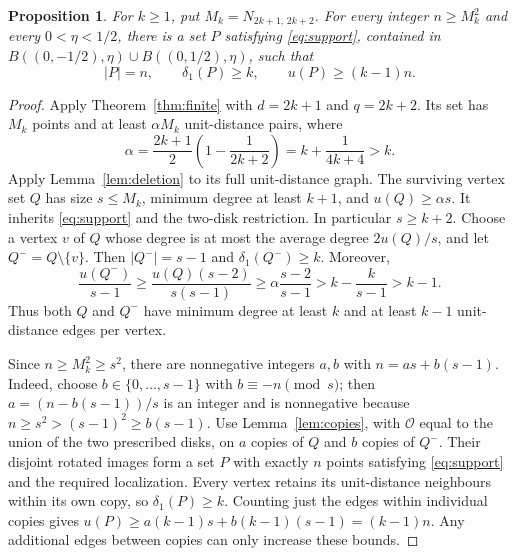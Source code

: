 \documentclass[a4paper,11pt]{amsart}
\newtheorem{proposition}[theorem]{Proposition}
\theoremstyle{remark}
\begin{document}
\begin{proposition}\label{prop:threshold}
For $k\ge1$, put $M_k=N_{2k+1,\,2k+2}$.
For every integer $n\ge M_k^2$ and every $0<\eta<1/2$, there is a set
$P$ satisfying \eqref{eq:support}, contained in
$B((0,-1/2),\eta)\cup B((0,1/2),\eta)$, such that
\begin{equation}\label{eq:threshold}
 |P|=n,\qquad \delta_1(P)\ge k,\qquad u(P)\ge(k-1)n.
\end{equation}
\end{proposition}

\begin{proof}
Apply Theorem~\ref{thm:finite} with $d=2k+1$ and $q=2k+2$.
Its set has $M_k$ points and at least $\alpha M_k$ unit-distance pairs,
where
\[
 \alpha=\frac{2k+1}{2}\left(1-\frac1{2k+2}\right)
        =k+\frac1{4k+4}>k.
\]
Apply Lemma~\ref{lem:deletion} to its full unit-distance graph.
The surviving vertex set $Q$ has size $s\le M_k$, minimum degree at
least $k+1$, and $u(Q)\ge\alpha s$.
It inherits \eqref{eq:support} and the two-disk restriction.
In particular $s\ge k+2$.
Choose a vertex $v$ of $Q$ whose degree is at most the average degree
$2u(Q)/s$, and let $Q^-=Q\setminus\{v\}$.
Then $|Q^-|=s-1$ and $\delta_1(Q^-)\ge k$. Moreover,
\[
 \frac{u(Q^-)}{s-1}
 \ge\frac{u(Q)(s-2)}{s(s-1)}
 \ge\alpha\frac{s-2}{s-1}
 >k-\frac{k}{s-1}>k-1.
\]
Thus both $Q$ and $Q^-$ have minimum degree at least $k$ and at least
$k-1$ unit-distance edges per vertex.

Since $n\ge M_k^2\ge s^2$, there are nonnegative integers $a,b$ with
$n=as+b(s-1)$.
Indeed, choose $b\in\{0,\ldots,s-1\}$ with $b\equiv-n\pmod s$;
then $a=(n-b(s-1))/s$ is an integer and is nonnegative because
$n\ge s^2>(s-1)^2\ge b(s-1)$.
Use Lemma~\ref{lem:copies}, with $\mathcal O$ equal to the union of the
two prescribed disks, on $a$ copies of $Q$ and $b$ copies of $Q^-$.
Their disjoint rotated images form a set $P$ with exactly $n$ points
satisfying \eqref{eq:support} and the required localization.
Every vertex retains its unit-distance neighbours within its own
copy, so $\delta_1(P)\ge k$.
Counting just the edges within individual copies gives
$u(P)\ge a(k-1)s+b(k-1)(s-1)=(k-1)n$.
Any additional edges between copies can only increase these bounds.
\end{proof}
\end{document}
